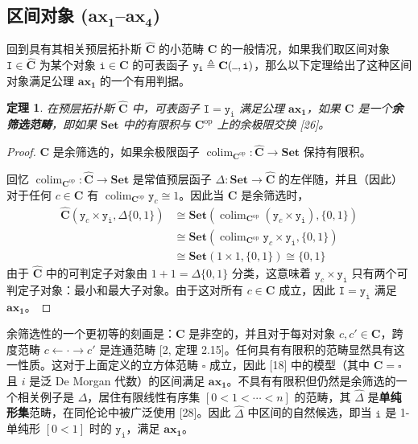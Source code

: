 \documentclass{ctexrep}
\theoremstyle{plain}
\newtheorem{theorem}{定理}[section]
\theoremstyle{definition}
\theoremstyle{remark}
\newcommand\ttI{\mathtt{I}}
\newcommand{\ax}[1]{\mathbf{ax_{#1}}}
\newcommand{\ul}{{\rule[0ex]{0.5em}{0.4pt}}} %
\newcommand{\tti}{\mathtt{i}}
\begin{document}
\subsection{区间对象 ($\ax{1}$--$\ax{4}$)}

回到具有其相关预层拓扑斯 $\widehat{\mathbf{C}}$ 的小范畴 $\mathbf{C}$ 的一般情况，如果我们取区间对象 $\ttI \in \widehat{\mathbf{C}}$ 为某个对象 $\mathtt{i} \in \mathbf{C}$ 的可表函子 $\mathtt{y}_{\tti} \triangleq \mathbf{C}(\ul , \tti)$，那么以下定理给出了这种区间对象满足公理 $\ax{1}$ 的一个有用判据。

\begin{theorem}
在预层拓扑斯 $\widehat{\mathbf{C}}$ 中，可表函子 $\ttI = \mathtt{y}_{\tti}$ 满足公理 $\ax{1}$，如果 $\mathbf{C}$ 是一个\textbf{余筛选范畴}，即如果 $\mathbf{Set}$ 中的有限积与 $\mathbf{C}^{\mathrm{op}}$ 上的余极限交换 [26]。
\end{theorem}

\begin{proof}
$\mathbf{C}$ 是余筛选的，如果余极限函子 $\operatorname{colim}_{\mathbf{C}^{\mathrm{op}}} : \widehat{\mathbf{C}} \to \mathbf{Set}$ 保持有限积。

回忆 $\operatorname{colim}_{\mathbf{C}^{\mathrm{op}}} : \widehat{\mathbf{C}} \to \mathbf{Set}$ 是常值预层函子 $\Delta : \mathbf{Set} \to \widehat{\mathbf{C}}$ 的左伴随，并且（因此）对于任何 $c \in \mathbf{C}$ 有 $\operatorname{colim}_{\mathbf{C}^{\mathrm{op}}} \mathtt{y}_c \cong 1$。因此当 $\mathbf{C}$ 是余筛选时，
\begin{align*}
\widehat{\mathbf{C}}(\mathtt{y}_c \times \mathtt{y}_{\tti}, \Delta\{0,1\}) &\cong \mathbf{Set}(\operatorname{colim}_{\mathbf{C}^{\mathrm{op}}}(\mathtt{y}_c \times \mathtt{y}_{\tti}), \{0,1\}) \\
&\cong \mathbf{Set}(\operatorname{colim}_{\mathbf{C}^{\mathrm{op}}} \mathtt{y}_c \times \mathtt{y}_{\tti}, \{0,1\}) \\
&\cong \mathbf{Set}(1 \times 1, \{0,1\}) \cong \{0,1\}
\end{align*}
由于 $\widehat{\mathbf{C}}$ 中的可判定子对象由 $1 + 1 = \Delta\{0,1\}$ 分类，这意味着 $\mathtt{y}_c \times \mathtt{y}_{\tti}$ 只有两个可判定子对象：最小和最大子对象。由于这对所有 $c \in \mathbf{C}$ 成立，因此 $\ttI = \mathtt{y}_{\tti}$ 满足 $\ax{1}$。
\end{proof}

余筛选性的一个更初等的刻画是：$\mathbf{C}$ 是非空的，并且对于每对对象 $c, c' \in \mathbf{C}$，跨度范畴 $c \leftarrow \cdot \rightarrow c'$ 是连通范畴 [2, 定理 2.15]。任何具有有限积的范畴显然具有这一性质。这对于上面定义的立方体范畴 $\square$ 成立，因此 [18] 中的模型（其中 $\mathbf{C} = \square$ 且 $i$ 是泛 De Morgan 代数）的区间满足 $\ax{1}$。不具有有限积但仍然是余筛选的一个相关例子是 $\Delta$，居住有限线性有序集 $[0 < 1 < \cdots < n]$ 的范畴，其 $\widehat{\Delta}$ 是\textbf{单纯形集}范畴，在同伦论中被广泛使用 [28]。因此 $\widehat{\Delta}$ 中区间的自然候选，即当 $\tti$ 是 1-单纯形 $[0 < 1]$ 时的 $\mathtt{y}_{\tti}$，满足 $\ax{1}$。
\end{document}
